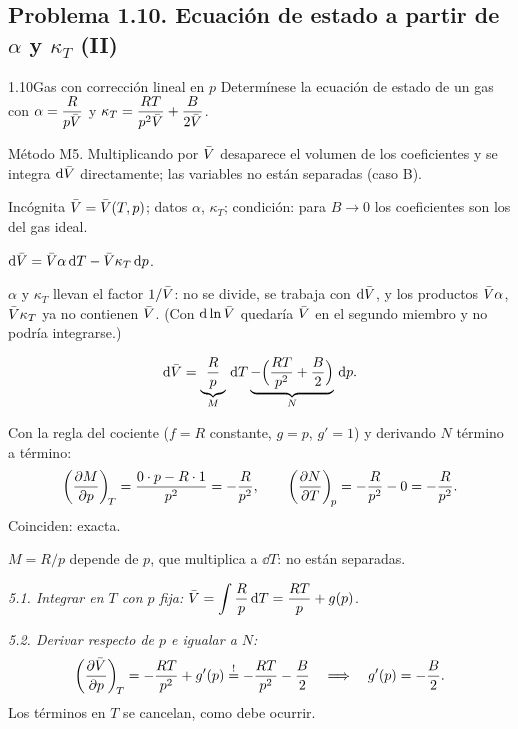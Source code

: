 \subsection{Problema 1.10. Ecuación de estado a partir de \texorpdfstring{$\alpha$}{alpha} y \texorpdfstring{$\kappa_T$}{kappa} (II)}
\begin{problema}{1.10}{Gas con corrección lineal en $p$}
Determínese la ecuación de estado de un gas con $\displaystyle\alpha=\frac{R}{p\bar{V}}$ y
$\displaystyle\kappa_T=\frac{RT}{p^2\bar{V}}+\frac{B}{2\bar{V}}$.
\end{problema}

\begin{resolucion}
\idea Método M5. Multiplicando por $\bar{V}$ desaparece el volumen de los coeficientes y se integra
$\mathrm{d}\bar{V}$ directamente; las variables no están separadas (caso B).

 Incógnita $\bar{V}=\bar{V}(T,p)$; datos $\alpha$, $\kappa_T$; condición: para $B\to0$
los coeficientes son los del gas ideal.

 $\mathrm{d}\bar{V}=\bar{V}\alpha\,\mathrm{d} T-\bar{V}\kappa_T\,\mathrm{d} p$.

 $\alpha$ y $\kappa_T$ llevan el factor $1/\bar{V}$: no se divide, se trabaja con $\mathrm{d}\bar{V}$,
y los productos $\bar{V}\alpha$, $\bar{V}\kappa_T$ ya no contienen $\bar{V}$. (Con $\mathrm{d}\ln\bar{V}$ quedaría $\bar{V}$ en el
segundo miembro y no podría integrarse.)

\[
  \mathrm{d}\bar{V}=\underbrace{\frac{R}{p}}_{M}\,\mathrm{d} T\underbrace{-\Bigl(\frac{RT}{p^2}+\frac{B}{2}\Bigr)}_{N}\,\mathrm{d} p.
\]

 Con la regla del cociente ($f=R$ constante, $g=p$, $g'=1$) y derivando
$N$ término a término:
\[
  \left(\frac{\partial M}{\partial p}\right)_{\!T}=\frac{0\cdot p-R\cdot1}{p^2}=-\frac{R}{p^2},\qquad
  \left(\frac{\partial N}{\partial T}\right)_{\!p}=-\frac{R}{p^2}-0=-\frac{R}{p^2}.
\]
Coinciden: exacta.

 $M=R/p$ depende de $p$, que multiplica a $\dd T$: no están separadas.

\emph{5.1. Integrar en $T$ con $p$ fija:} $\displaystyle\bar{V}=\int\frac Rp\,\mathrm{d} T=\frac{RT}{p}+g(p)$.

\emph{5.2. Derivar respecto de $p$ e igualar a $N$:}
\[
  \left(\frac{\partial \bar{V}}{\partial p}\right)_{\!T}=-\frac{RT}{p^2}+g'(p)\stackrel{!}{=}-\frac{RT}{p^2}-\frac B2
  \quad\Longrightarrow\quad g'(p)=-\frac B2.
\]
Los términos en $T$ se cancelan, como debe ocurrir.


\end{resolucion}

